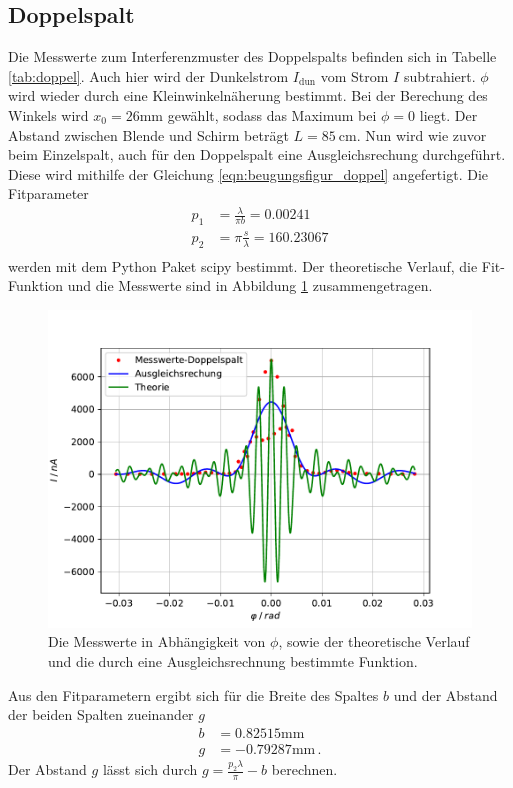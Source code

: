 \subsection{Doppelspalt}
Die Messwerte zum Interferenzmuster des Doppelspalts befinden sich in Tabelle \ref{tab:doppel}.
Auch hier wird der Dunkelstrom $I_\text{dun}$ vom Strom $I$ subtrahiert.
$\phi$ wird wieder durch eine Kleinwinkelnäherung bestimmt.
Bei der Berechung des Winkels wird $x_0 = 26 \si{\milli\meter}$ gewählt, sodass das Maximum bei $\phi = 0$ liegt.
Der Abstand zwischen Blende und Schirm beträgt $L = \SI{85}{\centi\meter}$.
Nun wird wie zuvor beim Einzelspalt, auch für den Doppelspalt eine Ausgleichsrechung durchgeführt.
Diese wird mithilfe der Gleichung \ref{eqn:beugungsfigur_doppel} angefertigt.
Die Fitparameter
\begin{align*}
p_1 &= \frac{\lambda}{\pi b} = 0.00241\\
p_2 &= \pi \frac{s}{\lambda} = 160.23067 \\
\end{align*}
werden mit dem Python Paket scipy \cite{scipy} bestimmt.
Der theoretische Verlauf, die Fit-Funktion und die Messwerte sind in Abbildung \ref{fig:doppel} zusammengetragen.
\begin{figure}
    \centering
    \includegraphics[width=\textwidth]{content/data/doppelspalt.pdf}
    \caption{Die Messwerte in Abhängigkeit von $\phi$, sowie der theoretische Verlauf und die durch eine Ausgleichsrechnung bestimmte Funktion.}
    \label{fig:doppel}
\end{figure}
Aus den Fitparametern ergibt sich für die Breite des Spaltes $b$ und der Abstand der beiden Spalten zueinander $g$
\begin{align*}
    b &= 0.82515\si{\milli\meter}\\
    g &= -0.79287 \si{\milli\meter} \, .
\end{align*}
Der Abstand $g$ lässt sich durch $g = \frac{p_2\lambda}{\pi} -b$ berechnen.

